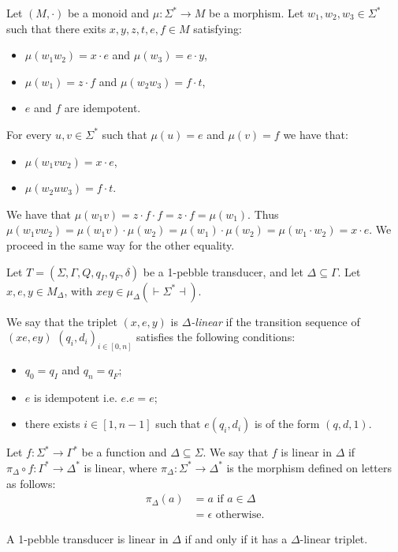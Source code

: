 \begin{lemma}
Let $(M,\cdot)$ be a monoid and $\mu:\Sigma^*\to M$ be a morphism. Let $w_1,w_2, w_3\in\Sigma^*$ such that there exits $x,y,z,t,e,f\in M$ satisfying:
\begin{itemize}
\item $\mu(w_1w_2)=x\cdot e$ and $\mu(w_3)=e\cdot y$,
\item $\mu(w_1)=z\cdot f$ and $\mu(w_2w_3)=f\cdot t$,
\item $e$ and $f$ are idempotent.
\end{itemize}
For every $u, v\in\Sigma^*$ such that $\mu(u)=e$ and $\mu(v)=f$ we have that:
\begin{itemize}
\item $\mu(w_1vw_2)=x\cdot e$, 
\item $\mu(w_2uw_3)=f\cdot t$.
\end{itemize}
\end{lemma}

\begin{pr}
We have that $\mu(w_1v)=z\cdot f\cdot f=z\cdot f=\mu(w_1)$.
Thus $\mu(w_1vw_2)=\mu(w_1v)\cdot \mu(w_2)=\mu(w_1)\cdot \mu(w_2)=\mu(w_1\cdot w_2) =x\cdot e$.
We proceed in the same way for the other equality.
\end{pr}

\begin{definition}
Let $T=(\Sigma,\Gamma,Q,q_I,q_F, \delta)$ be a 1-pebble transducer, and let $\Delta\subseteq \Gamma$. Let $x, e, y\in M_\Delta$, with $xey\in \mu_\Delta( { \vdash}\Sigma^*{ \dashv})$.

We say that the triplet $(x,e,y)$ is \emph{$\Delta$-linear} if the transition sequence of $(xe,ey)$
$(q_i,d_i)_{i\in[0,n]}$ satisfies the following conditions:
\begin{itemize}
\item $q_0=q_I$ and $q_n=q_F$;
\item $e$ is idempotent i.e. $e.e=e$;
\item there exists $i\in [1,n-1]$ such that $e(q_i,d_i)$ is of the form $(q,d,1)$.
\end{itemize}
\end{definition}

 \begin{definition}
Let $f:\Sigma^*\to \Gamma^*$ be a function and $\Delta\subseteq\Sigma$. We say that $f$ is linear in $\Delta$ if $\pi_\Delta\circ f: \Gamma^*\to \Delta^*$ is linear, where $\pi_\Delta:\Sigma^*\to \Delta^*$ is the morphism defined on letters as follows:
\begin{align*}
\pi_\Delta(a)&=a \text{ if }  a\in \Delta \\
&= \epsilon \text{ otherwise.}
\end{align*}
 \end{definition}
 
\begin{theorem}
A 1-pebble transducer is linear in $\Delta$ if and only if it has a $\Delta$-linear triplet.
\end{theorem}